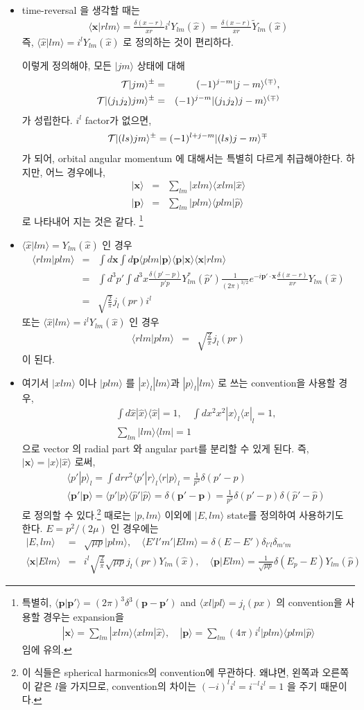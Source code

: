 \documentclass[10pt]{article}
\def\bm{\boldsymbol}
\newcommand{\bea}{\begin{eqnarray}}
\newcommand{\eea}{\end{eqnarray}}
\newcommand{\no}{\nonumber \\}
\def\vp{{\bm p}}
\def\vx{{\bm x}}
\def\la{\langle}
\def\ra{\rangle}
\begin{document}
\begin{itemize}
\item time-reversal 을 생각할 때는 
\bea
\la \vx|r lm\ra=\frac{\delta(x-r)}{xr} i^l Y_{lm}(\hat{x})
                         =\frac{\delta(x-r)}{xr} \tilde{Y}_{lm}(\hat{x})
\eea
즉, $\la \hat{x}| lm\ra=i^l Y_{lm}(\hat{x})$
로 정의하는 것이 편리하다. 

이렇게 정의해야, 모든 $|j m\ra$ 상태에 대해
\bea
{\cal T}|j m\ra^{\pm}&=&(-1)^{j-m}|j -m\ra^{(\mp)},\no
{\cal T}|(j_1 j_2) j m\ra^{\pm}&=&(-1)^{j-m}|(j_1 j_2) j -m\ra^{(\mp)}
\eea
가 성립한다. $i^l$ factor가 없으면, 
\bea
{\cal T}|(l s) j m\ra^{\pm}=
(-1)^{l+j-m}|(l s) j -m\ra^{\mp}
\eea
가 되어, orbital angular momentum 에 대해서는 특별히 다르게 취급해야한다. 하지만,
어느 경우에나,
\bea
|\vx\ra&=&\sum_{lm} |x lm\ra \la x lm|\hat{x}\ra\no
|\vp\ra&=&\sum_{lm} |p lm\ra \la p lm|\hat{p}\ra
\eea
로 나타내어 지는 것은 같다. \footnote{
특별히, $\la \vp|\vp'\ra=(2\pi)^3\delta^{3}(\vp-\vp')$
and $\la x l| p l\ra=j_l(px)$ 의 convention을 사용할 경우는
expansion을
\bea
|\vx\ra=\sum_{lm}|x lm\ra \la x lm|\hat{x}\ra,\quad 
|\vp\ra=\sum_{lm} (4\pi) i^l |p lm\ra \la plm|\hat{p}\ra
\eea
임에 유의.
}

\item
$\la \hat{x}|lm\ra=Y_{lm}(\hat{x})$ 인 경우
\bea
\la r lm|p lm\ra
&=&\int d\vx \int d \vp \la p lm|\vp\ra\la \vp|\vx\ra\la \vx|r lm\ra\no 
&=&\int d^3 p'\int d^3 x\frac{\delta(p'-p)}{p'p}Y^*_{lm}(\hat{p}')
                          \frac{1}{(2\pi)^{3/2}}e^{-i\vp'\cdot\vx}
                          \frac{\delta(x-r)}{xr}Y_{lm}(\hat{x})\no
                      &=&\sqrt{\frac{2}{\pi}}j_l(pr)i^l 
\eea
또는 $\la \hat{x}|lm\ra=i^ l Y_{lm}(\hat{x})$ 인 경우
\bea
\la r lm|p lm\ra &=&\sqrt{\frac{2}{\pi}}j_l(pr) 
\eea
이 된다.

\item 
여기서 $|x lm\ra$ 이나 $|p lm\ra$ 를 $|x\ra_l |lm\ra$과 $|p\ra_l |lm\ra$ 로 쓰는 
convention을 사용할 경우,
\bea
& &\int d\hat{x}|\hat{x}\ra\la \hat{x}|=1,\quad
\int dx^2 x^2 |x\ra_l \la x|_l=1,\no
& &\sum_{lm}|lm\ra\la lm|=1
\eea
으로 vector 의 radial part 와 angular part를 분리할 수 있게 된다.
즉, $|\vx\ra=|x\ra|\hat{x}\ra$ 로써, 
\bea
& &\la p'|p\ra_l=\int dr r^2 \la p'|r\ra_l \la r|p\ra_l=\frac{1}{p^2}\delta(p'-p)\no
& &\la \vp'|\vp\ra=\la p'|p\ra\la \hat{p}'|\hat{p}\ra 
    =\delta(\vp'-\vp)=\frac{1}{p^2}\delta(p'-p) \delta(\hat{p}'-\hat{p})
\eea
로 정의할 수 있다.\footnote{이 식들은 spherical harmonics의 convention에 무관하다.
왜냐면, 왼쪽과 오른쪽이 같은 $l$을 가지므로, convention의 차이는 
$(-i)^l i^l=i^{-l}i^l=1$ 을 주기 때문이다.
}
때로는 $|p,lm\ra$ 이외에 $|E,lm\ra$ state를 정의하여 사용하기도 한다.
$E=p^2/(2\mu)$ 인 경우에는
\bea
|E,lm\ra&=&\sqrt{\mu p}|p lm\ra,\quad
\la E' l' m'|E l m\ra=\delta(E-E')\delta_{l'l}\delta_{m'm}\no
\la \vx| E lm\ra&=& i^l\sqrt{\frac{2}{\pi}}\sqrt{\mu p} j_l(pr)Y_{lm}(\hat{x}),\quad
\la \vp| E lm\ra=
\frac{1}{\sqrt{\mu p}}\delta(E_p-E) Y_{lm}(\hat{p})
\eea

\end{itemize}
\end{document}
